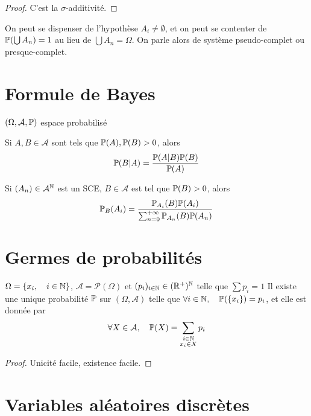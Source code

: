 \begin{proof}
    C'est la $\sigma$-additivité.
\end{proof}

\begin{rem}
    On peut se dispenser de l'hypothèse $A_i\neq \emptyset$, et on peut se contenter de  $\P(\bigcup A_n )=1$ au lieu de $ \bigcup A_n=\Omega $. On parle alors de système pseudo-complet ou presque-complet.
\end{rem}

\section{Formule de Bayes}

\begin{thm}[Bayes]
    \Hyp $(\Omega, \mathcal A, \P)$ espace probabilisé
    \begin{concenum}
        \item Si $A,B\in \mathcal A$ sont tels que $\P(A), \P(B)>0$, alors \[
            \P(B|A)=\frac{\P(A|B)\P(B)}{\P(A)}
        \] 
    \item Si $(A_n)\in  \mathcal A^{\N}$ est un SCE, $B\in \mathcal A$ est tel que $\P(B)>0$, alors \[
            \P_B(A_i)=\frac{\P_{A_i}(B)\P(A_i)}{\sum_{n=0}^{+\infty} \P_{A_n}(B)\P(A_n)}
    \] 
    \end{concenum}
\end{thm}

\section{Germes de probabilités}

\begin{prop}
    \Hyp $\Omega=\{x_i, \quad i \in  \N\}$, $\mathcal A=\mathcal P(\Omega)$ et $(p_i)_{i \in \N} \in (\R^+)^{\N}$ telle que $\sum p_i=1$
    \Conc Il existe une unique probabilité $\P$ sur $(\Omega, \mathcal A)$ telle que $\forall i \in  \N,\quad \P(\{x_i\})=p_i$, et elle est donnée par \[
        \forall X \in  \mathcal A,\quad \P(X)=\sum_{\substack{i \in  \N\\x_i\in X}}p_i
    \] 
\end{prop}

\begin{proof}
    Unicité facile, existence facile.
\end{proof}

\section{Variables aléatoires discrètes}

